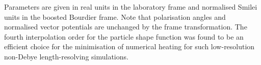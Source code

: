 %
Parameters are given in real units in the laboratory frame and normalised Smilei units in the boosted Bourdier frame. Note that polarisation angles and normalised vector potentials are unchanged by the frame transformation. The fourth interpolation order for the particle shape function was found to be an efficient choice for the minimisation of numerical heating for such low-resolution non-Debye length-resolving simulations.

